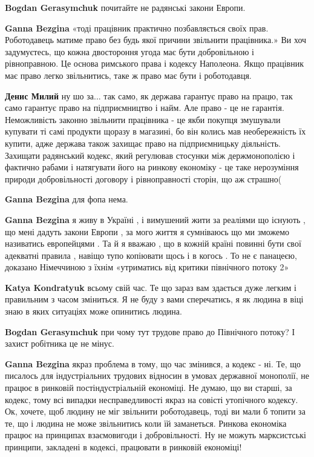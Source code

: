\begin{itemize}
\begin{itemize}
\textbf{Bogdan Gerasymchuk} почитайте не радянські закони Европи.

\textbf{Ganna Bezgina} «тоді працівник практично позбавляється своїх прав. Роботодавець матиме право без будь якої причини звільнити працівника.»
Ви хоч задумуєтесь, що кожна двостороння угода має бути добровільною і рівноправною. Це основа римського права і кодексу Наполеона. Якщо працівник має право легко звільнитись, таке ж право має бути і роботодавця.

\textbf{Денис Милий} ну шо за... так само, як держава гарантує право на працю, так само гарантує право на підприємництво і найм. Але право - це не гарантія. Неможливість законно звільнити працівника - це якби покупця змушували купувати ті самі продукти щоразу в магазині, бо він колись мав необережність їх купити, адже держава також захищає право на підприємницьку діяльність. Захищати радянський кодекс, який регулював стосунки між держмонополією і фактично рабами і натягувати його на ринкову економіку - це таке нерозуміння природи добровільності договору і рівноправності сторін, що аж страшно(

\textbf{Ganna Bezgina} для фопа нема.

\textbf{Ganna Bezgina} я живу в Україні , і вимушений жити за реаліями що існують , що мені дадуть закони Европи , за мого життя я сумніваюсь що ми зможемо називатись европейцями . Та й я вважаю , що в кожній країні повинні бути свої адекватні правила , навіщо тупо копіювати щось і в когось . То не є панацеєю, доказано Німеччиною з їхнім «утриматись від критики північного потоку 2»

\textbf{Katya Kondratyuk} всьому свій час. Те що зараз вам здається дуже легким і правильним з часом зміниться. Я не буду з вами сперечатись, я як людина в віці знаю в яких ситуаціях може опинитись людина.

\textbf{Bogdan Gerasymchuk} при чому тут трудове право до Північного потоку? І захист робітника це не мінус.

\textbf{Ganna Bezgina} якраз проблема в тому, що час змінився, а кодекс - ні. Те, що писалось для індустріальних трудових відносин в умовах державної монополії, не працює в ринковій постіндустріальній економіці. Не думаю, що ви старші, за кодекс, тому всі випадки несправедливості якраз на совісті утопічного кодексу.
Ок, хочете, щоб людину не міг звільнити роботодавець, тоді ви мали б топити за те, що і людина не може звільнитись коли їй заманеться. Ринкова економіка працює на принципах взаємовигоди і добровільності. Ну не можуть марксистські принципи, закладені в кодексі, працювати в ринковій економіці!


\end{itemize}
\end{itemize}
